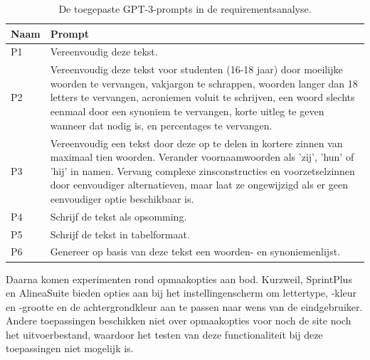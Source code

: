
\begin{center}
	\begin{table}[H]
		\begin{tabular}{ | m{2cm} | m{14cm} | } 
			\hline
			\textbf{Naam} & \textbf{Prompt} \\
			\hline
			P1 & Vereenvoudig deze tekst. \\
			\hline
			P2 & Vereenvoudig deze tekst voor studenten (16-18 jaar) door moeilijke woorden te vervangen, vakjargon te schrappen, woorden langer dan 18 letters te vervangen, acroniemen voluit te schrijven, een woord slechts eenmaal door een synoniem te vervangen, korte uitleg te geven wanneer dat nodig is, en percentages te vervangen. \\
			\hline
			P3 & Vereenvoudig een tekst door deze op te delen in kortere zinnen van maximaal tien woorden. Verander voornaamwoorden als 'zij', 'hun' of 'hij' in namen. Vervang complexe zinsconstructies en voorzetselzinnen door eenvoudiger alternatieven, maar laat ze ongewijzigd als er geen eenvoudiger optie beschikbaar is. \\
			\hline
			P4 & Schrijf de tekst als opsomming. \\
			\hline
			P5 & Schrijf de tekst in tabelformaat. \\
			\hline
			P6 & Genereer op basis van deze tekst een woorden- en synoniemenlijst. \\
			\hline
		\end{tabular}
		\caption{De toegepaste GPT-3-prompts in de requirementsanalyse.}
		\label{table:tested-prompts-requirementsanalysis}
	\end{table}
\end{center}

\medspace

Daarna komen experimenten rond opmaakopties aan bod. Kurzweil, SprintPlus en AlineaSuite bieden opties aan bij het instellingenscherm om lettertype, -kleur en -grootte en de achtergrondkleur aan te passen naar wens van de eindgebruiker. Andere toepassingen beschikken niet over opmaakopties voor noch de site noch het uitvoerbestand, waardoor het testen van deze functionaliteit bij deze toepassingen niet mogelijk is.

